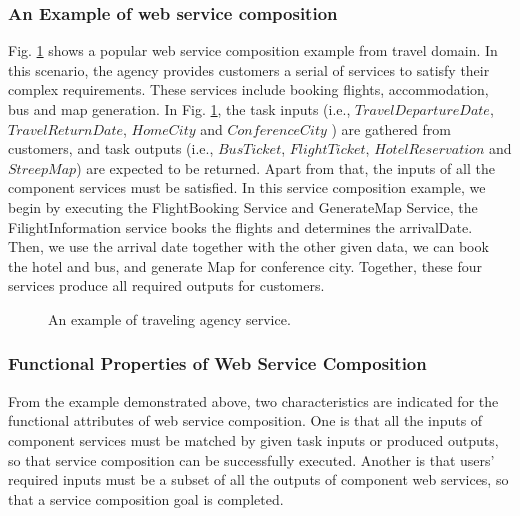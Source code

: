 \subsubsection{An Example of web service composition}
Fig. \ref{fig:wsc_example} shows a popular web service composition example from travel domain. In this scenario, the agency provides customers a serial of services to satisfy their complex requirements. These services include booking flights, accommodation, bus and map generation. In Fig. \ref{fig:wsc_example}, the task inputs (i.e., $TravelDepartureDate$, $TravelReturnDate$, $HomeCity$ and $ConferenceCity$ ) are gathered from customers, and task outputs (i.e., $BusTicket$, $FlightTicket$, $HotelReservation$ and $StreepMap$) are expected to be returned. Apart from that, the inputs of all the component services must be satisfied. In this service composition example, we begin by executing the FlightBooking Service and GenerateMap Service, the FilightInformation service books the flights and determines the arrivalDate. Then, we use the arrival date together with the other given data, we can book the hotel and bus, and generate Map for conference city. Together, these four services produce all required outputs for customers.

\begin{figure}
\centerline{
}
\caption{An example of traveling agency service.}
\label{fig:wsc_example}
\end{figure}

\subsubsection{Functional Properties of Web Service Composition}
From the example demonstrated above, two characteristics are indicated for the functional attributes of web service composition. One is that all the inputs of component services must be matched by given task inputs or produced outputs, so that service composition can be successfully executed. Another is that users' required inputs must be a subset of all the outputs of component web services, so that a service composition goal is completed. 

